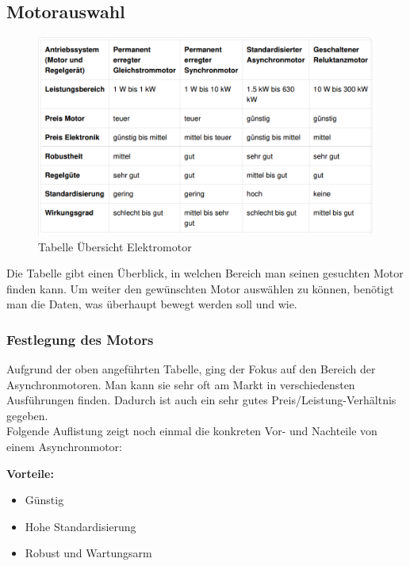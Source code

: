 \documentclass[12pt]{scrreprt} %
\begin{document}
\subsection{Motorauswahl}
\label{sec:motorauswahl}

\begin{figure}[!ht]
\begin{center}
	\caption{Tabelle Übersicht Elektromotor}
	\includegraphics[width=1\textwidth]{TabelleMotor}
\end{center}
\end{figure}

Die Tabelle gibt einen Überblick, in welchen Bereich man seinen gesuchten Motor finden kann. 
Um weiter den gewünschten Motor auswählen zu können, benötigt man die Daten, was überhaupt bewegt werden soll und wie. 

\subsubsection{Festlegung des Motors}
\label{sec:festlegungDesMotors}

Aufgrund der oben angeführten Tabelle, ging der Fokus auf den Bereich der Asynchronmotoren. Man kann sie sehr oft am Markt in verschiedensten Ausführungen finden. Dadurch ist auch ein sehr gutes Preis/Leistung-Verhältnis gegeben. 
\\
Folgende Auflistung zeigt noch einmal die konkreten Vor- und Nachteile von einem Asynchronmotor:


\textbf{Vorteile:}

\begin{itemize}
	\item{Günstig}
	\item{Hohe Standardisierung}
	\item{Robust und Wartungsarm}
\end{itemize}
\end{document}
